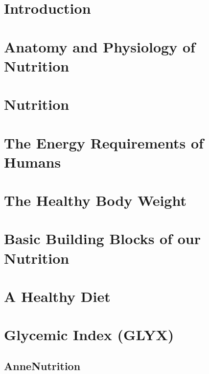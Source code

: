 \documentclass[../main.tex]{subfiles}
\begin{document}
\chapter{Introduction}


\chapter{Anatomy and Physiology of Nutrition}


\chapter{Nutrition}

\chapter{The Energy Requirements of Humans} %


\chapter{The Healthy Body Weight} %


\chapter{Basic Building Blocks of our Nutrition}


\chapter{A Healthy Diet}



\chapter{Glycemic Index (GLYX)}





\section{AnneNutrition}




\label{SpecialFoods} %





\label{FoodSoy}
\end{document}
